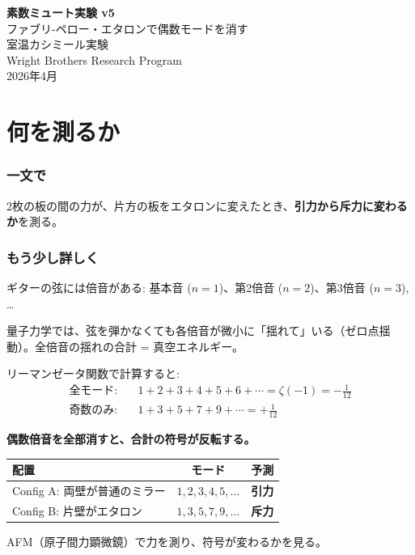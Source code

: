 \documentclass[12pt,a4paper]{article}
\begin{document}
\begin{center}
{\Huge\bfseries 素数ミュート実験 v5}\\[0.5cm]
{\Large ファブリ-ペロー・エタロンで偶数モードを消す}\\[0.3cm]
{\Large 室温カシミール実験}\\[1cm]
{\large Wright Brothers Research Program}\\[0.3cm]
{2026年4月}
\end{center}

\vspace{0.5cm}
\tableofcontents
\newpage

\part{何を測るか}

\section{一文で}

2枚の板の間の力が、片方の板をエタロンに変えたとき、\textbf{引力から斥力に変わるか}を測る。

\section{もう少し詳しく}

\begin{storybox}[ギターの弦]
ギターの弦には倍音がある: 基本音 ($n=1$)、第2倍音 ($n=2$)、第3倍音 ($n=3$), \ldots

量子力学では、弦を弾かなくても各倍音が微小に「揺れて」いる（ゼロ点揺動）。全倍音の揺れの合計 = 真空エネルギー。

リーマンゼータ関数で計算すると:
\begin{align*}
\text{全モード:} &\quad 1+2+3+4+5+6+\cdots = \zeta(-1) = -\frac{1}{12} \\
\text{奇数のみ:} &\quad 1+3+5+7+9+\cdots = +\frac{1}{12}
\end{align*}

\textbf{偶数倍音を全部消すと、合計の符号が反転する。}
\end{storybox}

\begin{resultbox}[実験の本質]
\begin{center}
\renewcommand{\arraystretch}{1.4}
\begin{tabular}{lcc}
\toprule
配置 & モード & 予測 \\
\midrule
Config A: 両壁が普通のミラー & $1,2,3,4,5,\ldots$ & \textbf{引力} \\
Config B: 片壁がエタロン & $1,3,5,7,9,\ldots$ & \textbf{斥力} \\
\bottomrule
\end{tabular}
\end{center}

AFM（原子間力顕微鏡）で力を測り、符号が変わるかを見る。
\end{resultbox}
\end{document}
